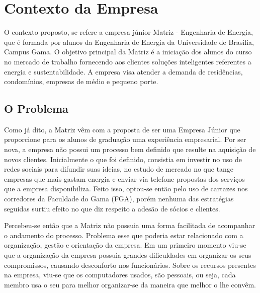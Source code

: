 \chapter[Contexto da Empresa]{Contexto da Empresa}
O contexto proposto, se refere a empresa júnior Matriz - Engenharia de Energia, que é 
formada por alunos da Engenharia de Energia da Universidade de Brasilia, Campus Gama. 
O objetivo principal da Matriz é a iniciação dos alunos do curso no mercado de trabalho 
fornecendo aos clientes soluções inteligentes referentes a energia e sustentabilidade.
A empresa visa atender a demanda de residências, condomínios, empresas de médio 
e pequeno porte. 

\section{O Problema}
Como já dito, a Matriz vêm com a proposta de ser uma Empresa Júnior que proporcione para 
os alunos de graduação uma experiência empresarial. Por ser nova, a empresa não possui 
um processo bem definido que resulte na aquisição de novos clientes. Inicialmente o que 
foi definido, consistia em investir no uso de redes sociais para difundir suas ideias, 
no estudo de mercado no que tange empresas que mais gastam energia e enviar via telefone
propostas dos serviços que a empresa disponibiliza. Feito isso, optou-se então pelo uso de
cartazes nos corredores da Faculdade do Gama (FGA), porém nenhuma das estratégias seguidas
surtiu efeito no que diz respeito a adesão de sócios e clientes.

Percebeu-se então que a Matriz não possuia uma forma facilitada de acompanhar o andamento 
do processo. Problema esse que poderia estar relacionado com a organização, gestão e 
orientação da empresa. Em um primeiro momento viu-se que a 
organização da empresa possuia grandes dificuldades em organizar os seus compromissos, 
causando desconforto nos funcionários. Sobre os recursos presentes na empresa, viu-se que 
os computadores usados, são pessoais, ou seja, cada membro usa o seu para melhor organizar-se 
da maneira que melhor o lhe convêm. 

